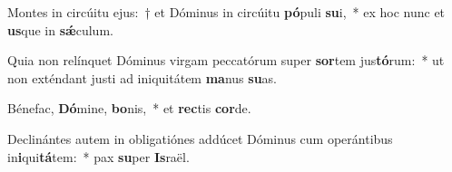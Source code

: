 \item Montes in circúitu ejus:~† et Dóminus in circúitu \textbf{pó}puli \textbf{su}i,~* ex hoc nunc et \textbf{us}que in \textbf{sǽ}culum.
\item Quia non relínquet Dóminus virgam peccatórum super \textbf{sor}tem jus\textbf{tó}rum:~* ut non exténdant justi ad iniquitátem \textbf{ma}nus \textbf{su}as.
\item Bénefac, \textbf{Dó}mine, \textbf{bo}nis,~* et \textbf{rec}tis \textbf{cor}de.
\item Declinántes autem in obligatiónes addúcet Dóminus cum operántibus in\textbf{i}qui\textbf{tá}tem:~* pax \textbf{su}per \textbf{Is}raël.
